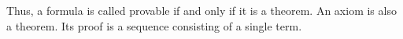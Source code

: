 

\setcounter{section}{2}
\setcounter{subsection}{1}
\setcounter{dfn}{2}

Thus, a formula is called provable if and only if it is a theorem.
An axiom is also a theorem.
Its proof is a sequence consisting of a single term.




